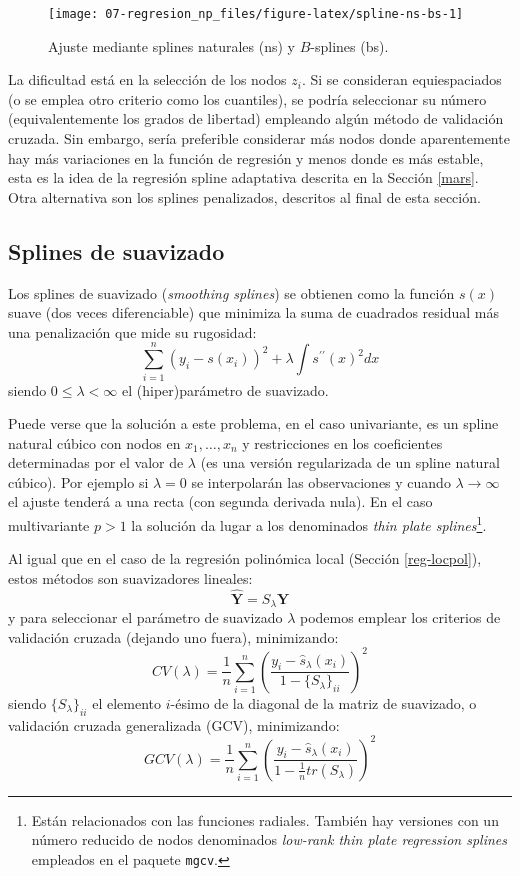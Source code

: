 \documentclass[
]{book}
\theoremstyle{break}
\theoremstyle{nonumberplain}
\begin{document}
\begin{figure}[!htb]

{\centering \texttt{[image: 07-regresion\_np\_files/figure-latex/spline-ns-bs-1]} 

}

\caption{Ajuste mediante splines naturales (ns) y $B$-splines (bs).}\label{fig:spline-ns-bs}
\end{figure}

La dificultad está en la selección de los nodos \(z_i\). Si se consideran equiespaciados (o se emplea otro criterio como los cuantiles), se podría seleccionar su número (equivalentemente los grados de libertad) empleando algún método de validación cruzada.
Sin embargo, sería preferible considerar más nodos donde aparentemente hay más variaciones en la función de regresión y menos donde es más estable, esta es la idea de la regresión spline adaptativa descrita en la Sección \ref{mars}.
Otra alternativa son los splines penalizados, descritos al final de esta sección.

\hypertarget{splines-de-suavizado}{%
\subsection{Splines de suavizado}\label{splines-de-suavizado}}

Los splines de suavizado (\emph{smoothing splines}) se obtienen como la función \(s(x)\) suave (dos veces diferenciable) que minimiza la suma de cuadrados residual más una penalización que mide su rugosidad:
\[\sum_{i=1}^{n} (y_i - s(x_i))^2  + \lambda \int s^{\prime\prime}(x)^2 dx\]
siendo \(0 \leq \lambda < \infty\) el (hiper)parámetro de suavizado.

Puede verse que la solución a este problema, en el caso univariante, es un spline natural cúbico con nodos en \(x_1, \ldots, x_n\) y restricciones en los coeficientes determinadas por el valor de \(\lambda\) (es una versión regularizada de un spline natural cúbico).
Por ejemplo si \(\lambda = 0\) se interpolarán las observaciones y cuando \(\lambda \rightarrow \infty\) el ajuste tenderá a una recta (con segunda derivada nula).
En el caso multivariante \(p> 1\) la solución da lugar a los denominados \emph{thin plate splines}\footnote{Están relacionados con las funciones radiales. También hay versiones con un número reducido de nodos denominados \emph{low-rank thin plate regression splines} empleados en el paquete \texttt{mgcv}.}.

Al igual que en el caso de la regresión polinómica local (Sección \ref{reg-locpol}), estos métodos son suavizadores lineales:
\[\hat{\mathbf{Y}} = S_{\lambda}\mathbf{Y}\]
y para seleccionar el parámetro de suavizado \(\lambda\) podemos emplear los criterios de validación cruzada (dejando uno fuera), minimizando:
\[CV(\lambda)=\frac{1}{n}\sum_{i=1}^n\left(\frac{y_i-\hat{s}_{\lambda}(x_i)}{1 - \{ S_{\lambda}\}_{ii}}\right)^2\]
siendo \(\{ S_{\lambda}\}_{ii}\) el elemento \(i\)-ésimo de la diagonal de la matriz de suavizado,
o validación cruzada generalizada (GCV), minimizando:
\[GCV(\lambda)=\frac{1}{n}\sum_{i=1}^n\left(\frac{y_i-\hat{s}_{\lambda}(x_i)}{1 - \frac{1}{n}tr(S_{\lambda})}\right)^2\]
\end{document}
